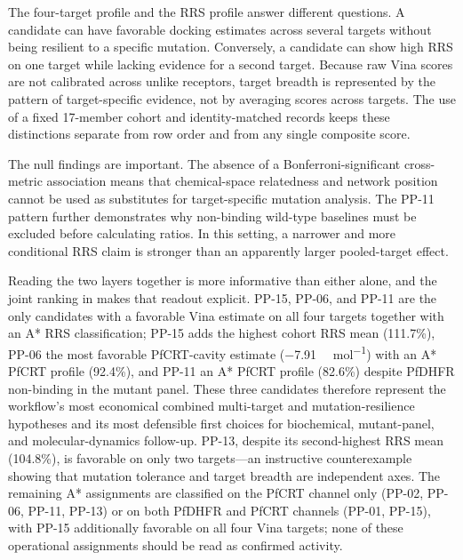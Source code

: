 \documentclass[journal=jcisd8,manuscript=article]{achemso}
\begin{document}
The four-target profile and the RRS profile answer different questions. A candidate can have favorable docking estimates across several targets without being resilient to a specific mutation. Conversely, a candidate can show high RRS on one target while lacking evidence for a second target. Because raw Vina scores are not calibrated across unlike receptors, target breadth is represented by the pattern of target-specific evidence, not by averaging scores across targets. The use of a fixed 17-member cohort and identity-matched records keeps these distinctions separate from row order and from any single composite score.

The null findings are important. The absence of a Bonferroni-significant cross-metric association means that chemical-space relatedness and network position cannot be used as substitutes for target-specific mutation analysis. The PP-11 pattern further demonstrates why non-binding wild-type baselines must be excluded before calculating ratios. In this setting, a narrower and more conditional RRS claim is stronger than an apparently larger pooled-target effect.

Reading the two layers together is more informative than either alone, and the joint ranking in  makes that readout explicit. PP-15, PP-06, and PP-11 are the only candidates with a favorable Vina estimate on all four targets together with an A* RRS classification; PP-15 adds the highest cohort RRS mean (\num{111.7}\%), PP-06 the most favorable PfCRT-cavity estimate (\num{-7.91} \si{\kilo\calorie\per\mole}) with an A* PfCRT profile (\num{92.4}\%), and PP-11 an A* PfCRT profile (\num{82.6}\%) despite PfDHFR non-binding in the mutant panel. These three candidates therefore represent the workflow's most economical combined multi-target and mutation-resilience hypotheses and its most defensible first choices for biochemical, mutant-panel, and molecular-dynamics follow-up. PP-13, despite its second-highest RRS mean (\num{104.8}\%), is favorable on only two targets—an instructive counterexample showing that mutation tolerance and target breadth are independent axes. The remaining A* assignments are classified on the PfCRT channel only (PP-02, PP-06, PP-11, PP-13) or on both PfDHFR and PfCRT channels (PP-01, PP-15), with PP-15 additionally favorable on all four Vina targets; none of these operational assignments should be read as confirmed activity.
\end{document}
